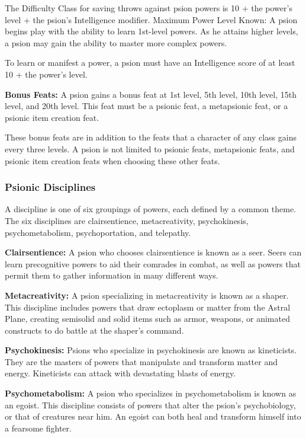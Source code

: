 The Difficulty Class for saving throws against psion powers is 10 + the power's level + the psion's Intelligence modifier. Maximum Power Level Known: A psion begins play with the ability to learn 1st-level powers. As he attains higher levels, a psion may gain the ability to master more complex powers.

To learn or manifest a power, a psion must have an Intelligence score of at least 10 + the power's level.

\textbf{Bonus Feats:} A psion gains a bonus feat at 1st level, 5th level, 10th level, 15th level, and 20th level. This feat must be a psionic feat, a metapsionic feat, or a psionic item creation feat.

These bonus feats are in addition to the feats that a character of any class gains every three levels. A psion is not limited to psionic feats, metapsionic feats, and psionic item creation feats when choosing these other feats.

\subsubsection{Psionic Disciplines}

A discipline is one of six groupings of powers, each defined by a common theme. The six disciplines are clairsentience, metacreativity, psychokinesis, psychometabolism, psychoportation, and telepathy.

\textbf{Clairsentience:} A psion who chooses clairsentience is known as a seer. Seers can learn precognitive powers to aid their comrades in combat, as well as powers that permit them to gather information in many different ways.

\textbf{Metacreativity:} A psion specializing in metacreativity is known as a shaper. This discipline includes powers that draw ectoplasm or matter from the Astral Plane, creating semisolid and solid items such as armor, weapons, or animated constructs to do battle at the shaper's command.

\textbf{Psychokinesis:} Psions who specialize in psychokinesis are known as kineticists. They are the masters of powers that manipulate and transform matter and energy. Kineticists can attack with devastating blasts of energy.

\textbf{Psychometabolism:} A psion who specializes in psychometabolism is known as an egoist. This discipline consists of powers that alter the psion's psychobiology, or that of creatures near him. An egoist can both heal and transform himself into a fearsome fighter.

